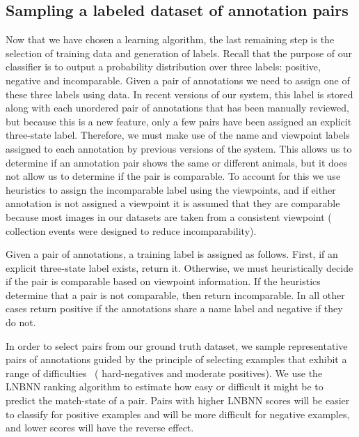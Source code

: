     \subsection{Sampling a labeled dataset of annotation pairs}
    Now that we have chosen a learning algorithm, the last remaining step is the selection of training data and
      generation of labels.
    Recall that the purpose of our classifier is to output a probability distribution over three labels:
    positive, negative and incomparable.
    Given a pair of annotations we need to assign one of these three labels using \groundtruth{} data.
    In recent versions of our system, this \groundtruth{} label is stored along with each unordered pair of
      annotations that has been manually reviewed, but because this is a new feature, only a few pairs have been
      assigned an explicit three-state label.
    Therefore, we must make use of the name and viewpoint labels assigned to each annotation by previous versions
      of the system.
    This allows us to determine if an annotation pair shows the same or different animals, but it does not allow
      us to determine if the pair is comparable.
    To account for this we use heuristics to assign the incomparable label using the viewpoints, and if either
      annotation is not assigned a viewpoint it is assumed that they are comparable because most images in our
      datasets are taken from a consistent viewpoint (\ie{} collection events were designed to reduce
      incomparability).

    Given a pair of annotations, a training label is assigned as follows.
    First, if an explicit three-state label exists, return it.
    Otherwise, we must heuristically decide if the pair is comparable based on viewpoint information.
    If the heuristics determine that a pair is not comparable, then return incomparable.
    In all other cases return positive if the annotations share a name label and negative if they do not.

    In order to select pairs from our ground truth dataset, we sample representative pairs of annotations guided
      by the principle of selecting examples that exhibit a range of difficulties~\cite{shi_embedding_2016} (\eg
      hard-negatives and moderate positives).
    We use the LNBNN ranking algorithm to estimate how easy or difficult it might be to predict the match-state
      of a pair.
    Pairs with higher LNBNN scores will be easier to classify for positive examples and will be more difficult
      for negative examples, and lower scores will have the reverse effect.

